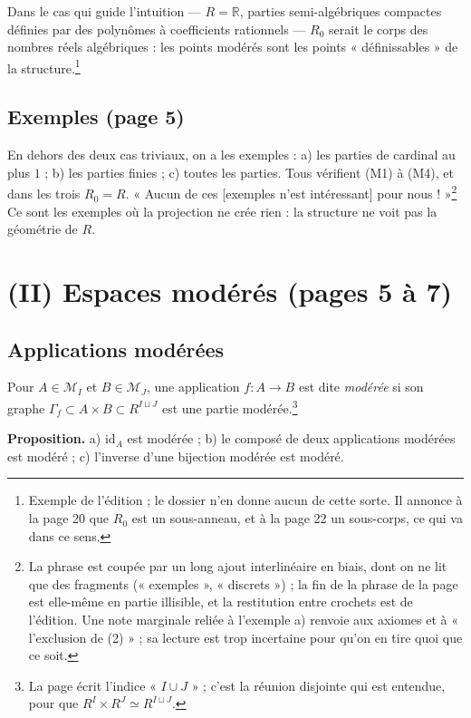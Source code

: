 \documentclass[11pt,a4paper]{article}
\begin{document}
Dans le cas qui guide l'intuition — $R = \mathbb{R}$, parties semi-algébriques
compactes définies par des polynômes à coefficients rationnels — $R_0$ serait
le corps des nombres réels algébriques : les points modérés sont les points
« définissables » de la structure.\footnote{Exemple de l'édition ; le dossier
n'en donne aucun de cette sorte. Il annonce à la page 20 que $R_0$ est un
sous-anneau, et à la page 22 un sous-corps, ce qui va dans ce sens.}

\subsection*{Exemples (page 5)}

En dehors des deux cas triviaux, on a les exemples : a) les parties de
cardinal au plus $1$ ; b) les parties finies ; c) toutes les parties. Tous
vérifient (M1) à (M4), et dans les trois $R_0 = R$. « Aucun de ces
[exemples n'est intéressant] pour nous ! »\footnote{La phrase est coupée par un
long ajout interlinéaire en biais, dont on ne lit que des fragments
(« exemples », « discrets ») ; la fin de la phrase de la page est elle-même en
partie illisible, et la restitution entre crochets est de l'édition. Une note
marginale reliée à l'exemple a) renvoie aux axiomes et à « l'exclusion de
(2) » ; sa lecture est trop incertaine pour qu'on en tire quoi que ce soit.}
Ce sont les exemples où la projection ne crée rien : la structure ne voit pas
la géométrie de $R$.

\section*{(II) Espaces modérés (pages 5 à 7)}

\subsection*{Applications modérées}

Pour $A \in \mathcal{M}_I$ et $B \in \mathcal{M}_J$, une application $f : A \to
B$ est dite \emph{modérée} si son graphe $\Gamma_f \subset A \times B \subset
R^{I \sqcup J}$ est une partie modérée.\footnote{La page écrit l'indice
« $I \cup J$ » ; c'est la réunion disjointe qui est entendue, pour que
$R^I \times R^J \simeq R^{I \sqcup J}$.}

\textbf{Proposition.} a) $\mathrm{id}_A$ est modérée ; b) le composé de deux
applications modérées est modéré ; c) l'inverse d'une bijection modérée est
modéré.
\end{document}
